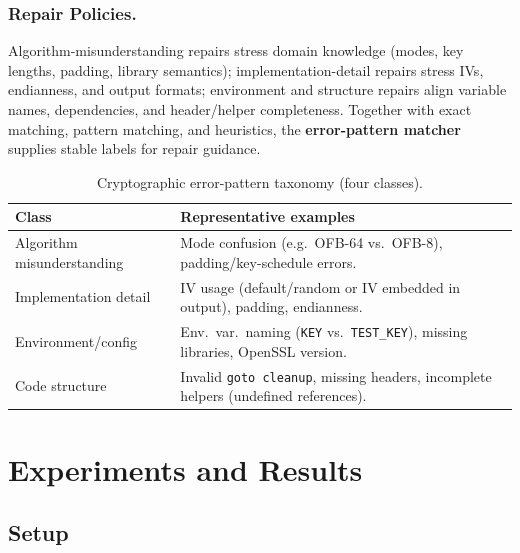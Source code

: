 \documentclass[runningheads]{llncs}
\begin{document}
\subsubsection{Repair Policies.}
Algorithm-misunderstanding repairs stress domain knowledge (modes, key lengths, padding, library semantics); implementation-detail repairs stress IVs, endianness, and output formats; environment and structure repairs align variable names, dependencies, and header/helper completeness. Together with exact matching, pattern matching, and heuristics, the \textbf{error-pattern matcher} supplies stable labels for repair guidance.
\begin{table}[H]
  \centering
  \caption{Cryptographic error-pattern taxonomy (four classes).}
  \label{tab:error_classification}
  {\scriptsize\setlength{\tabcolsep}{3.5pt}\renewcommand{\arraystretch}{0.95}
  \begin{tabular}{p{}p{}}
    \toprule
    Class & Representative examples \\
    \midrule
    Algorithm misunderstanding & Mode confusion (e.g.\ OFB-64 vs.\ OFB-8), padding/key-schedule errors. \\
    Implementation detail & IV usage (default/random or IV embedded in output), padding, endianness. \\
    Environment/config & Env.\ var.\ naming (\texttt{KEY} vs.\ \texttt{TEST\_KEY}), missing libraries, OpenSSL version. \\
    Code structure & Invalid \texttt{goto cleanup}, missing headers, incomplete helpers (undefined references). \\
    \bottomrule
  \end{tabular}
  }
\end{table}



\section{Experiments and Results}
\label{sec:experiments}
\subsection{Setup}
\end{document}
